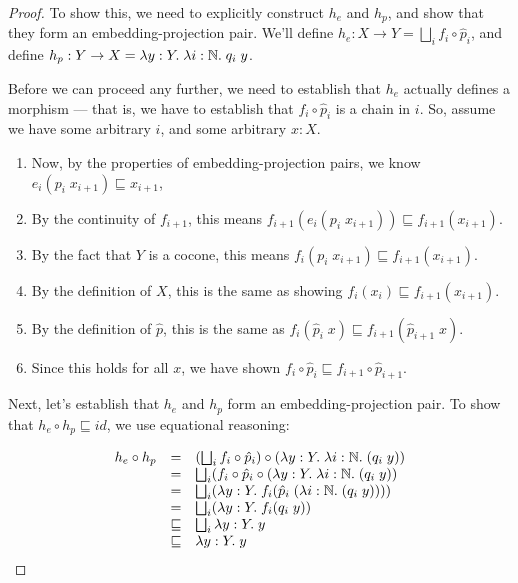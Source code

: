 \begin{proof}
To show this, we need to explicitly construct $h_e$ and $h_p$, and show
that they form an embedding-projection pair. We'll define $h_e : X \to Y = 
\bigsqcup_i f_i \circ \hat{p}_i$, and define 
$h_p : Y \to X = \lambda y:Y.\; \lambda i:\mathbb{N}.\; q_i\; y$.

Before we can proceed any further, we need to establish that $h_e$
actually defines a morphism --- that is, we have to establish that
$f_i \circ \hat{p}_i$ is a chain in $i$. So, assume we have some
arbitrary $i$, and some arbitrary $x : X$.

\begin{enumerate}
\item Now, by the properties of embedding-projection pairs, we know
$e_i(p_i\;x_{i+1}) \sqsubseteq x_{i+1}$, 
\item By the continuity of $f_{i+1}$, 
this means $f_{i+1}(e_i(p_i\;x_{i+1})) \sqsubseteq f_{i+1}(x_{i+1})$. 
\item By the fact that $Y$ is a cocone, this
means $f_i(p_i\;x_{i+1})
\sqsubseteq f_{i+1}(x_{i+1})$. 
\item By the
definition of $X$, this is 
the same as showing $f_i(x_i) \sqsubseteq f_{i+1}(x_{i+1})$. 
\item By the definition of $\hat{p}$, this is the same as 
   $f_i(\hat{p}_i\;x) \sqsubseteq f_{i+1}(\hat{p}_{i+1}\;x)$. 
\item Since this holds for all $x$, we have 
shown $f_i \circ \hat{p}_i \sqsubseteq f_{i+1} \circ \hat{p}_{i+1}$. 
\end{enumerate}

Next, let's establish that $h_e$ and $h_p$ form an embedding-projection
pair. To show that $h_e \circ h_p \sqsubseteq id$, we use equational reasoning:

\begin{displaymath}
  \begin{array}{lcl}
    h_e \circ h_p  
     & = & 
      (\bigsqcup_i f_i \circ \hat{p}_i) \circ (\lambda y:Y.\; \lambda i:\mathbb{N}.\; (q_i\; y)) 
\\
      & = & 
      \bigsqcup_i (f_i \circ \hat{p}_i \circ (\lambda y:Y.\; \lambda i:\mathbb{N}.\; (q_i\; y)) 
\\      
      & = & 
      \bigsqcup_i (\lambda y:Y.\;f_i(\hat{p}_i\;(\lambda i:\mathbb{N}.\; (q_i\; y))))
\\
      & = & 
      \bigsqcup_i (\lambda y:Y.\;f_i(q_i\; y))
\\
      & \sqsubseteq & 
      \bigsqcup_i \lambda y:Y.\;y
\\
      & \sqsubseteq & 
      \lambda y:Y.\;y
\\
  \end{array}
\end{displaymath}


\end{proof}
